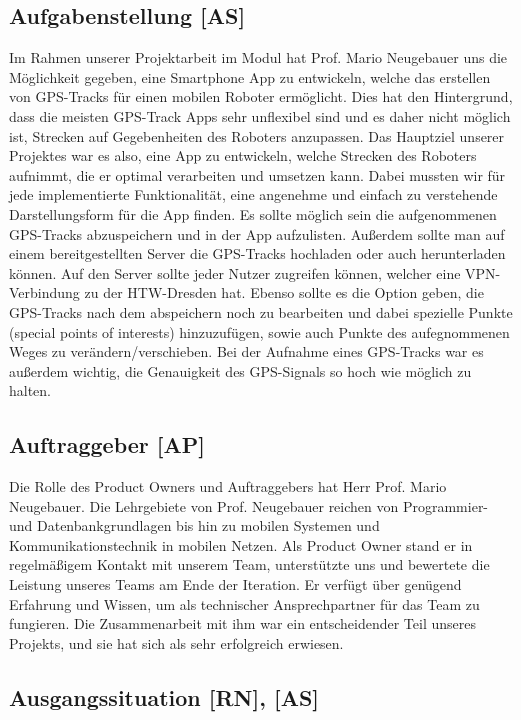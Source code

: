 \documentclass[10pt]{article}
\begin{document}
\subsection{Aufgabenstellung [AS]}
    Im Rahmen unserer Projektarbeit im Modul  hat Prof. Mario Neugebauer uns die Möglichkeit gegeben,
    eine Smartphone App zu entwickeln, welche das erstellen von GPS-Tracks für einen mobilen 
    Roboter ermöglicht. Dies hat den Hintergrund, dass die meisten GPS-Track Apps sehr unflexibel sind und es daher nicht 
    möglich ist, Strecken auf Gegebenheiten des Roboters anzupassen. Das Hauptziel unserer Projektes war es also, eine App zu entwickeln, 
    welche Strecken des Roboters aufnimmt, die er optimal verarbeiten und umsetzen kann.
    Dabei mussten wir für jede implementierte Funktionalität,
    eine angenehme und einfach zu verstehende Darstellungsform für die App finden.
    Es sollte möglich sein die aufgenommenen GPS-Tracks abzuspeichern und in der App aufzulisten.
    Außerdem sollte man auf einem bereitgestellten Server die GPS-Tracks hochladen oder auch herunterladen können.
    Auf den Server sollte jeder Nutzer zugreifen können, welcher eine VPN-Verbindung zu der HTW-Dresden hat.
    Ebenso sollte es die Option geben, die GPS-Tracks nach dem abspeichern noch zu bearbeiten und dabei spezielle Punkte (special points of interests) 
    hinzuzufügen, sowie auch Punkte des aufegnommenen Weges zu verändern/verschieben.
    Bei der Aufnahme eines GPS-Tracks war es außerdem wichtig, die Genauigkeit des GPS-Signals so hoch wie möglich zu halten. 
\subsection{Auftraggeber [AP]}
    Die Rolle des Product Owners und Auftraggebers hat Herr Prof. Mario Neugebauer. Die Lehrgebiete von Prof. Neugebauer
    reichen von Programmier- und Datenbankgrundlagen bis hin zu mobilen Systemen und Kommunikationstechnik in 
    mobilen Netzen. Als Product Owner stand er in regelmäßigem Kontakt mit unserem Team, unterstützte uns und
    bewertete die Leistung unseres Teams am Ende der Iteration. Er verfügt über genügend Erfahrung und Wissen,
    um als technischer Ansprechpartner für das Team zu fungieren. Die Zusammenarbeit mit ihm war ein entscheidender Teil 
    unseres Projekts, und sie hat sich als sehr erfolgreich erwiesen.

\subsection{Ausgangssituation [RN], [AS]}
\end{document}
